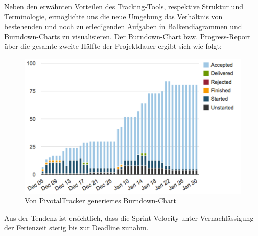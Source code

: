 	 Neben den erwähnten Vorteilen des Tracking-Tools, respektive Struktur und Terminologie, ermöglichte uns die neue Umgebung das Verhältnis von bestehenden und noch zu erledigenden Aufgaben in Balkendiagrammen und Burndown-Charts zu visualisieren. Der Burndown-Chart bzw. Progress-Report über die gesamte zweite Hälfte der Projektdauer ergibt sich wie folgt:
	 
\begin{figure}[h]
	\centering
	\hspace{1.6cm}\includegraphics[width=.6\textwidth]{Pictures/burndown-compiled}
	\caption{Von PivotalTracker generiertes Burndown-Chart \label{fig:BurndownCompiled}}
\end{figure}

	Aus der Tendenz ist ersichtlich, dass die Sprint-Velocity unter Vernachlässigung der Ferienzeit stetig bis zur Deadline zunahm.
